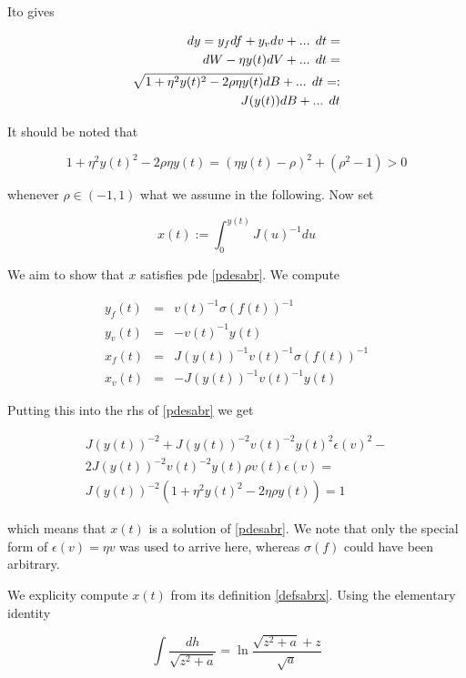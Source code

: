 \documentclass{amsart}
\theoremstyle{plain}
\numberwithin{equation}{section}
\begin{document}
Ito gives

\begin{eqnarray}
dy = y_f df + y_v dv + \textnormal{... } dt = \\
 dW - \eta y(t) dV + \textnormal{... } dt = \\
 \sqrt{ 1 + \eta^2 y(t)^2 - 2 \rho\eta y(t) }  dB + \textnormal{... } dt =: \\
 J(y(t)) dB + \textnormal{... } dt
\end{eqnarray}

It should be noted that

\begin{equation}
1+\eta^2 y(t)^2 - 2\rho\eta y(t) = (\eta y(t) - \rho)^2 + (\rho^2-1) > 0
\end{equation}

whenever $\rho \in (-1,1)$ what we assume in the following. Now set

\begin{equation}\label{defsabrx}
x(t):=\int_0^{y(t)} J(u)^{-1} du
\end{equation}

We aim to show that $x$ satisfies pde \ref{pdesabr}. We compute

\begin{eqnarray}
y_f(t) &=& v(t)^{-1} \sigma(f(t))^{-1} \\
y_v(t) &=& -v(t)^{-1} y(t) \\
x_f(t) &=& J(y(t))^{-1} v(t)^{-1} \sigma(f(t))^{-1} \\
x_v(t) &=& -J(y(t))^{-1} v(t)^{-1} y(t)
\end{eqnarray}

Putting this into the rhs of \ref{pdesabr} we get

\begin{eqnarray}
J(y(t))^{-2} + J(y(t))^{-2} v(t)^{-2} y(t)^2 \epsilon(v)^2 - \\
2 J(y(t))^{-2} v(t)^{-2} y(t) \rho v(t) \epsilon(v) = \\
J(y(t))^{-2} ( 1 + \eta^2 y(t)^2 - 2 \eta \rho y(t) ) = 1 
\end{eqnarray} 

which means that $x(t)$ is a solution of \ref{pdesabr}. We note that only the special form of
$\epsilon(v) = \eta v$ was used to arrive here, whereas $\sigma(f)$ could have been arbitrary.

We explicity compute $x(t)$ from its definition \ref{defsabrx}. Using the elementary identity

\begin{equation}
\int \frac{dh}{\sqrt{z^2+a}} = \ln \frac{\sqrt{z^2+a}+z}{\sqrt{a}}
\end{equation}
\end{document}
